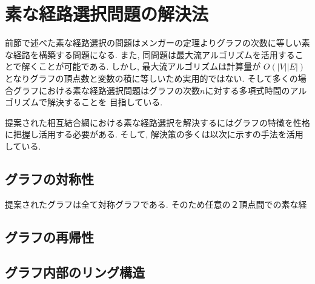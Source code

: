 \documentclass[specialreport]{subfiles}
\begin{document}
\section{素な経路選択問題の解決法}
前節で述べた素な経路選択の問題はメンガーの定理よりグラフの次数に等しい素な経路を構築する問題になる.
また, 同問題は最大流アルゴリズムを活用することで解くことが可能である. しかし, 最大流アルゴリズムは計算量が
$O(|V||E|)$となりグラフの頂点数と変数の積に等しいため実用的ではない. 
そして多くの場合グラフにおける素な経路選択問題はグラフの次数$n$に対する多項式時間のアルゴリズムで解決することを
目指している.

提案された相互結合網における素な経路選択を解決するにはグラフの特徴を性格に把握し活用する必要がある.
そして, 解決策の多くは以次に示すの手法を活用している.
\subsection{グラフの対称性}
提案されたグラフは全て対称グラフである. そのため任意の２頂点間での素な経

\subsection{グラフの再帰性}

\subsection{グラフ内部のリング構造}
\end{document}
